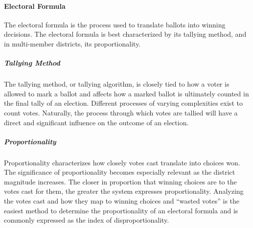 \paragraph{Electoral Formula}
The electoral formula is the process used to translate ballots into winning
decisions. The electoral formula is best characterized by its tallying method,
and in multi-member districts, its proportionality.

\subparagraph{Tallying Method}
The tallying method, or tallying algorithm, is closely tied to how a voter is
allowed to mark a ballot and affects how a marked ballot is ultimately counted
in the final tally of an election. Different processes of varying complexities
exist to count votes. Naturally, the process through which votes are tallied
will have a direct and significant influence on the outcome of an election.

\subparagraph{Proportionality}
Proportionality characterizes how closely votes cast translate into choices won.
The significance of proportionality becomes especially relevant as the district
magnitude increases. The closer in proportion that winning choices are to the
votes cast for them, the greater the system expresses proportionality. Analyzing
the votes cast and how they map to winning choices and ``wasted votes'' is the
easiest method to determine the proportionality of an electoral formula and is
commonly expressed as the index of disproportionality.







% 

% 
